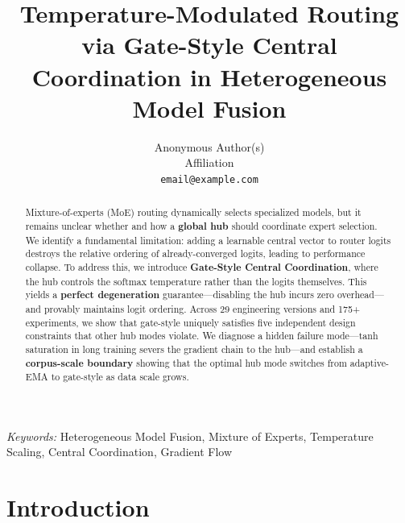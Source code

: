 \documentclass[10pt,twoside]{article}
\title{Temperature-Modulated Routing via Gate-Style Central Coordination in Heterogeneous Model Fusion}
\author{
    Anonymous Author(s)\\
    Affiliation\\
    \texttt{email@example.com}
}
\providecommand{\keywords}[1]{\vspace{0.5em}\noindent\textit{Keywords:} #1}
\theoremstyle{definition}
\begin{document}
\maketitle

\vspace{-0.5em}
\begin{center}
\end{center}
\vspace{0.5em}

\begin{abstract}
Mixture-of-experts (MoE) routing dynamically selects specialized models, but it remains unclear whether and how a \textbf{global hub} should coordinate expert selection. We identify a fundamental limitation: adding a learnable central vector to router logits destroys the relative ordering of already-converged logits, leading to performance collapse. To address this, we introduce \textbf{Gate-Style Central Coordination}, where the hub controls the softmax temperature rather than the logits themselves. This yields a \textbf{perfect degeneration} guarantee---disabling the hub incurs zero overhead---and provably maintains logit ordering. Across 29 engineering versions and 175+ experiments, we show that gate-style uniquely satisfies five independent design constraints that other hub modes violate. We diagnose a hidden failure mode---tanh saturation in long training severs the gradient chain to the hub---and establish a \textbf{corpus-scale boundary} showing that the optimal hub mode switches from adaptive-EMA to gate-style as data scale grows.
\end{abstract}

\keywords{Heterogeneous Model Fusion, Mixture of Experts, Temperature Scaling, Central Coordination, Gradient Flow}

\section{Introduction}
\end{document}
